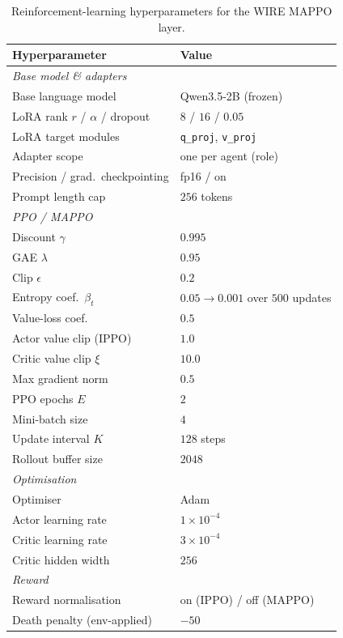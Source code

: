 \begin{table}[h]
\centering
\caption{Reinforcement-learning hyperparameters for the WIRE MAPPO layer.}
\label{tab:rl_hyperparams}
\small
\begin{tabular}{ll}
\toprule
Hyperparameter & Value \\
\midrule
\multicolumn{2}{l}{\emph{Base model \& adapters}} \\
Base language model            & Qwen3.5-2B (frozen) \\
LoRA rank $r$ / $\alpha$ / dropout & $8$ / $16$ / $0.05$ \\
LoRA target modules            & \texttt{q\_proj}, \texttt{v\_proj} \\
Adapter scope                  & one per agent (role) \\
Precision / grad.\ checkpointing & fp16 / on \\
Prompt length cap              & $256$ tokens \\
\midrule
\multicolumn{2}{l}{\emph{PPO / MAPPO}} \\
Discount $\gamma$              & $0.995$ \\
GAE $\lambda$                  & $0.95$ \\
Clip $\epsilon$               & $0.2$ \\
Entropy coef.\ $\beta_t$       & $0.05 \rightarrow 0.001$ over $500$ updates \\
Value-loss coef.              & $0.5$ \\
Actor value clip (IPPO)       & $1.0$ \\
Critic value clip $\xi$       & $10.0$ \\
Max gradient norm             & $0.5$ \\
PPO epochs $E$                & $2$ \\
Mini-batch size               & $4$ \\
Update interval $K$           & $128$ steps \\
Rollout buffer size           & $2048$ \\
\midrule
\multicolumn{2}{l}{\emph{Optimisation}} \\
Optimiser                     & Adam \\
Actor learning rate           & $1\times10^{-4}$ \\
Critic learning rate          & $3\times10^{-4}$ \\
Critic hidden width           & $256$ \\
\midrule
\multicolumn{2}{l}{\emph{Reward}} \\
Reward normalisation          & on (IPPO) / off (MAPPO) \\
Death penalty (env-applied)    & $-50$ \\
\bottomrule
\end{tabular}
\end{table}

